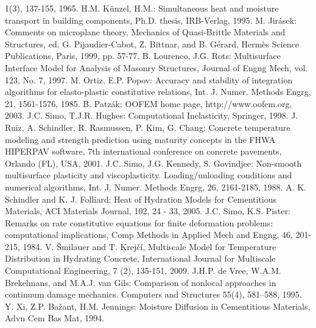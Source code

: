 \documentclass[a4paper]{article}
\begin{document}
\begin{thebibliography}{99}
1(3), 137-155, 1965.
 H.M. K{\"u}nzel, H.M.: Simultaneous heat and
  moisture transport in building components, Ph.D. thesis, IRB-Verlag,
  1995.
 M. Jir\'{a}sek: Comments on microplane theory, Mechanics of Quasi-Brittle Materials and Structures, ed. G. Pijaudier-Cabot, Z. Bittnar, and B. G\'{e}rard, Herm\`{e}s Science Publications, Paris, 1999, pp. 57-77.
 B. Lourenco, J.G. Rots: Multisurface Interface Model for Analysis of Masonry Structures, Journal of Engng Mech, vol. 123, No. 7, 1997.
 M. Ortiz, E.P. Popov: Accuracy and stability of integration algorithms for elasto-plastic constitutive relations, Int. J. Numer. Methods Engrg, 21, 1561-1576, 1985.
 B. Patz\'ak: OOFEM home page, http://www.oofem.org, 2003.
 J.C. Simo, T.J.R. Hughes: Computational Inelasticity, Springer, 1998.
 J. Ruiz, A. Schindler, R. Rasmussen, P. Kim, G. Chang: Concrete temperature modeling and strength prediction using maturity concepts in the FHWA HIPERPAV software, 7th international conference on concrete pavements, Orlando (FL), USA, 2001.
 J.C. Simo, J.G. Kennedy, S. Govindjee: Non-smooth multisurface plasticity and viscoplasticity. Loading/unloading conditions and numerical algorithms, Int. J. Numer. Methods Engrg, 26, 2161-2185, 1988.
 A. K. Schindler and K. J. Folliard: Heat of Hydration Models for Cementitious Materials, ACI Materials Journal, 102, 24 - 33, 2005.
 J.C. Simo, K.S. Pister: Remarks on rate constitutive equations for finite deformation problems: computational implications, Comp Methods in Applied Mech and Engng, 46, 201-215, 1984.
 V. \v{S}milauer and T. Krej\v{c}\'i, Multiscale
  Model for Temperature Distribution in Hydrating Concrete,
  International Journal for Multiscale Computational Engineering, 7
  (2), 135-151, 2009.
 J.H.P. de Vree, W.A.M. Brekelmans, and M.A.J. van Gils: Comparison of nonlocal approaches in continuum damage mechanics. Computers and Structures 55(4), 581–588, 1995.
 Y. Xi, Z.P. Ba\v{z}ant, H.M. Jennings: Moisture Diffusion
  in Cementitious Materials, Advn Cem Bas Mat, 1994.
\end{thebibliography}
\end{document}
